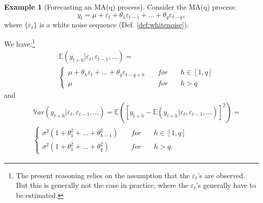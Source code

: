 \documentclass[
  11pt,
]{book}
\theoremstyle{definition}
\theoremstyle{definition}
\newtheorem{example}{Example}[chapter]
\theoremstyle{definition}
\theoremstyle{definition}
\theoremstyle{remark}
\begin{document}
\begin{example}[Forecasting an MA(q) process]
\protect\hypertarget{exm:fcstMAq}{}\label{exm:fcstMAq}Consider the MA(q) process:
\[
y_t = \mu + \varepsilon_t + \theta_1 \varepsilon_{t-1} + \dots + \theta_q \varepsilon_{t-q},
\]
where \(\{\varepsilon_t\}\) is a white noise sequence (Def. \ref{def:whitenoise}).

We have:\footnote{The present reasoning relies on the assumption that the \(\varepsilon_t\)'s are observed. But this is generally not the case in practice, where the \(\varepsilon_t\)'s generally have to be estimated.}
\begin{eqnarray*}
&&\mathbb{E}(y_{t+h}|\varepsilon_{t},\varepsilon_{t-1},\dots) =\\
&&\left\{
\begin{array}{lll}
\mu + \theta_h \varepsilon_{t} + \dots + \theta_q \varepsilon_{t-q+h}  \quad &for& \quad h \in [1,q]\\
\mu \quad &for& \quad h > q
\end{array}
\right.
\end{eqnarray*}
and
\begin{eqnarray*}
&&\mathbb{V}ar(y_{t+h}|\varepsilon_{t},\varepsilon_{t-1},\dots)= \mathbb{E}\left( [y_{t+h} - \mathbb{E}(y_{t+h}|\varepsilon_{t},\varepsilon_{t-1},\dots)]^2 \right) =\\
&&\left\{
\begin{array}{lll}
\sigma^2(1+\theta_1^2+\dots+\theta_{h-1}^2) \quad &for& \quad h \in [1,q]\\
\sigma^2(1+\theta_1^2+\dots+\theta_q^2) \quad &for& \quad h>q.
\end{array}
\right.
\end{eqnarray*}
\end{example}
\end{document}

